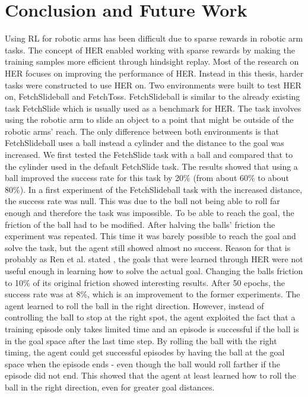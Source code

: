 \chapter{Conclusion and Future Work}

Using RL for robotic arms has been difficult due to sparse rewards in robotic arm tasks. The concept of HER enabled working with sparse rewards by making the training samples more efficient through hindsight replay. Most of the research on HER focuses on improving the performance of HER. Instead in this thesis, harder tasks were constructed to use HER on. 
\newline
Two environments were built to test HER on, FetchSlideball and FetchToss. 
\newline
FetchSlideball is similar to the already existing task FetchSlide which is usually used as a benchmark for HER. The task involves using the robotic arm to slide an object to a point that might be outside of the robotic arms' reach. The only difference between both environments is that FetchSlideball uses a ball instead a cylinder and the distance to the goal was increased. We first tested the FetchSlide task with a ball and compared that to the cylinder used in the default FetchSlide task. The results showed that using a ball improved the success rate for this task by 20\% (from about 60\% to about 80\%). In a first experiment of the FetchSlideball task with the increased distance, the success rate was null. This was due to the ball not being able to roll far enough and therefore the task was impossible. To be able to reach the goal, the friction of the ball had to be modified. After halving the balls' friction the experiment was repeated. This time it was barely possible to reach the goal and solve the task, but the agent still showed almost no success. Reason for that is probably as Ren et al. stated \cite{hgg}, the goals that were learned through HER were not useful enough in learning how to solve the actual goal. Changing the balls friction to 10\% of its original friction showed interesting results. After 50 epochs, the success rate was at 8\%, which is an improvement to the former experiments. The agent learned to roll the ball in the right direction. However, instead of controlling the ball to stop at the right spot, the agent exploited the fact that a training episode only takes limited time and an episode is successful if the ball is in the goal space after the last time step. By rolling the ball with the right timing, the agent could get successful episodes by having the ball at the goal space when the episode ends - even though the ball would roll farther if the episode did not end. This showed that the agent at least learned how to roll the ball in the right direction, even for greater goal distances. 
